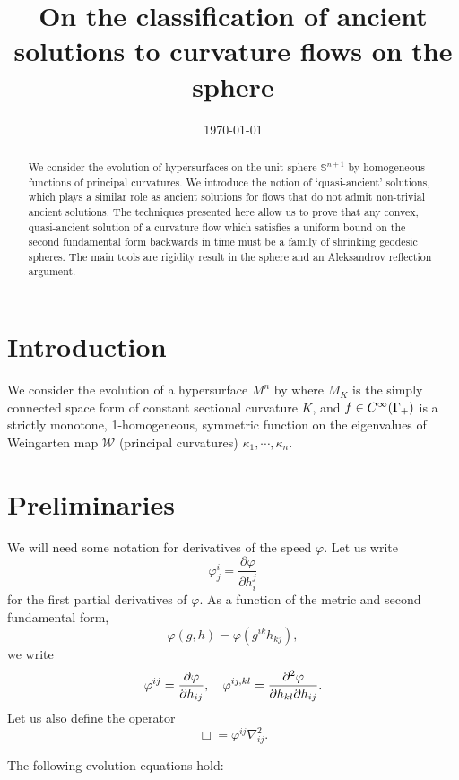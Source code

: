 \documentclass{amsart}
\begin{document}
\title[Ancient solutions to curvature flows in the sphere]
 {On the classification of ancient solutions to curvature flows on the sphere}

\curraddr{}
\email{}
\date{\today}

\dedicatory{}
\subjclass[2010]{}
\keywords{}

\begin{abstract}
We consider the evolution of hypersurfaces on the unit sphere $\mathbb{S}^{n+1}$ by homogeneous functions of principal curvatures. We introduce the notion of `quasi-ancient' solutions, which plays a similar role as ancient solutions for flows that do not admit non-trivial ancient solutions. The techniques presented here allow us to prove that any convex, quasi-ancient solution of a curvature flow which satisfies a uniform bound on the second fundamental form backwards in time must be a family of shrinking geodesic spheres. The main tools are rigidity result in the sphere and an Aleksandrov reflection argument.
\end{abstract}

\maketitle
\section{Introduction}
We consider the evolution of a hypersurface $M^n$ by
\eq{\label{eq:CurvFlow}
\partial_tx=-\varphi(f)\nu,~ x:M^n\times[0,T)\to M_K,
}
where \(M_K\) is the simply connected space form of constant sectional curvature \(K\), and $f\in C^{\infty}(\Gamma_+)$ is a strictly monotone, 1-homogeneous, symmetric function on the eigenvalues of Weingarten map \(\mathcal{W}\) (principal curvatures) \(\kappa_1, \cdots, \kappa_n\).
\section{Preliminaries}
We will need some notation for derivatives of the speed \(\varphi\). Let us write
\[
\varphi^{i}_{j} = \frac{\partial \varphi}{\partial h^{j}_{i}}
\]
for the first partial derivatives of \(\varphi\). As a function of the metric and second fundamental form,
\[
\varphi(g, h) = \varphi(g^{ik} h_{kj}),
\]
we write
\[
\varphi^{ij} = \frac{\partial\varphi}{\partial h_{ij}}, \quad \varphi^{ij,kl} = \frac{\partial^2\varphi}{\partial h_{kl} \partial h_{ij}}.
\]
Let us also define the operator
\[
\Box = \varphi^{ij} \nabla^2_{ij}.
\]
\begin{lemma} \label{lem: basi ev}
The following evolution equations hold:
\end{lemma}
\end{document}

